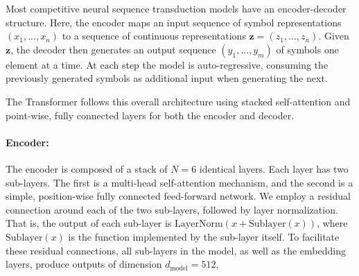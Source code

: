 \documentclass{article}
\newcommand{\dmodel}{d_{\text{model}}}
\begin{document}
Most competitive neural sequence transduction models have an encoder-decoder structure. Here, the encoder maps an input sequence of symbol representations $(x_1, ..., x_n)$ to a sequence of continuous representations $\mathbf{z} = (z_1, ..., z_n)$. Given $\mathbf{z}$, the decoder then generates an output sequence $(y_1,...,y_m)$ of symbols one element at a time. At each step the model is auto-regressive, consuming the previously generated symbols as additional input when generating the next.

The Transformer follows this overall architecture using stacked self-attention and point-wise, fully connected layers for both the encoder and decoder.

\paragraph{Encoder:}The encoder is composed of a stack of $N=6$ identical layers. Each layer has two sub-layers. The first is a multi-head self-attention mechanism, and the second is a simple, position-wise fully connected feed-forward network. We employ a residual connection around each of the two sub-layers, followed by layer normalization. That is, the output of each sub-layer is $\mathrm{LayerNorm}(x + \mathrm{Sublayer}(x))$, where $\mathrm{Sublayer}(x)$ is the function implemented by the sub-layer itself. To facilitate these residual connections, all sub-layers in the model, as well as the embedding layers, produce outputs of dimension $\dmodel=512$.
\end{document}
